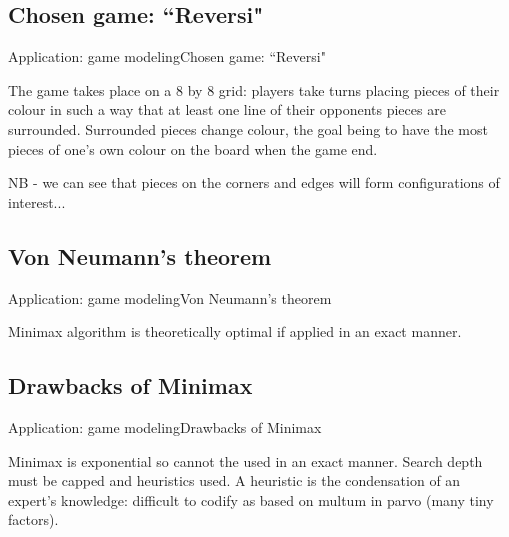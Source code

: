 \subsection{Chosen game: ``Reversi"}
\begin{frame}{Application: game modeling}{Chosen game: ``Reversi"}

The game takes place on a 8 by 8 grid: players take turns placing pieces of 
their colour in such a way that at least one line of their opponents pieces are
surrounded. Surrounded pieces change colour, the goal being to have the most 
pieces of one's own colour on the board when the game end.

NB - we can see that pieces on the corners and edges will form configurations of 
interest...

\end{frame}

\subsection{Von Neumann's theorem}
\begin{frame}{Application: game modeling}{Von Neumann's theorem}

Minimax algorithm is theoretically optimal if applied in an exact manner.

\end{frame}

\subsection{Drawbacks of Minimax}
\begin{frame}{Application: game modeling}{Drawbacks of Minimax}

Minimax is exponential so cannot the used in an exact manner. Search depth must 
be capped and heuristics used. A heuristic is the condensation of an expert's 
knowledge: difficult to codify as based on multum in parvo (many tiny factors).

\end{frame}

